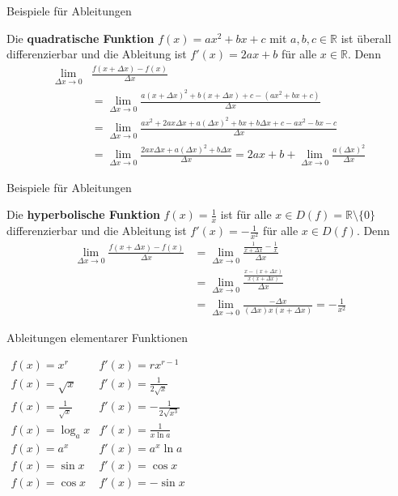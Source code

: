 \begin{frame}{Beispiele für Ableitungen}
	\begin{example}
		Die \textbf{quadratische Funktion} $f(x)=ax^{2}+bx+c$ mit $a,b,c \in \mathbb{R}$ ist überall differenzierbar und die Ableitung ist $f'(x) = 2ax+b$ für alle $x \in \mathbb{R}$. Denn
		\begin{align*}
		\lim_{\Delta x \to 0} & \frac{f(x+\Delta x) - f(x)}{\Delta x} \\ & = \lim_{\Delta x \to 0} \frac{a(x+\Delta x)^{2}+b(x+\Delta x) +c - (ax^{2}+bx+c)}{\Delta x} \\ &= \lim_{\Delta x \to 0} \frac{ax^{2} +2ax\Delta x +a(\Delta x)^{2} + bx +b \Delta x +c -ax^{2} - bx -c}{\Delta x} \\ &= \lim_{\Delta x \to 0  } \frac{2ax\Delta x + a(\Delta x)^{2} +b\Delta x}{\Delta x} = 2ax+b + \lim_{\Delta x \to 0} \frac{a(\Delta x)^{2}}{\Delta x}				
		\end{align*}
	\end{example}
\end{frame}

\begin{frame}{Beispiele für Ableitungen}
	\begin{example}
		Die \textbf{hyperbolische Funktion} $f(x)=\frac{1}{x}$ ist für alle $x\in D(f)=\mathbb{R}\setminus \{ 0 \}$ differenzierbar und die Ableitung ist $f'(x) = -\frac{1}{x^{2}}$ für alle $x \in D(f)$. Denn
		\begin{align*}
		\lim_{\Delta x \to 0} \frac{f(x+\Delta x) - f(x)}{\Delta x} & = \lim_{\Delta x \to 0} \frac{\frac{1}{x+\Delta x} - \frac{1}{x}}{\Delta x} \\ &= \lim_{\Delta x \to 0} \frac{\frac{x-(x+\Delta x)}{x(x+\Delta x)}}{\Delta x} \\ & = \lim_{\Delta x \to 0 } \frac{-\Delta x}{(\Delta x) x (x+\Delta x)} = -\frac{1}{x^{2}}			
		\end{align*}
	\end{example}	
\end{frame}

\begin{frame}{Ableitungen elementarer Funktionen}

{\LARGE $\begin{array}{cc}
	f(x)= x^{r} & f'(x)=r x^{r-1}  \\ 
	f(x)= \sqrt{x}& f'(x)=\frac{1}{2\sqrt{x}}  \\ 
	f(x)= \frac{1}{\sqrt{x}}& f'(x)= -\frac{1}{2\sqrt{x^{3}}}  \\ 
	f(x)= \log_{a} x & f'(x)=\frac{1}{x \ln a}  \\ 
	f(x)= a^{x}& f'(x)= a^{x} \ln a  \\ 
	f(x)= \sin x& f'(x)=\cos x \\ 
	f(x)= \cos x& f'(x)= -\sin x	  \\
\end{array} $
}
\end{frame}

